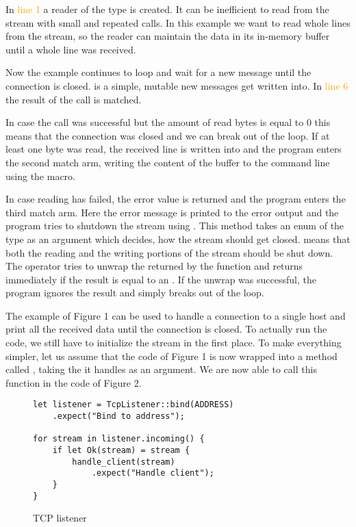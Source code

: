 In \textcolor{orange}{line 1} a reader of the type  is created. It can be inefficient to read
from the stream with small and repeated calls. In this example we want to read whole lines from the stream, so the
reader can maintain the data in its in-memory buffer until a whole line was received.

Now the example continues to loop and wait for a new message until the connection is closed.  is a simple,
mutable  new messages get written into. In \textcolor{orange}{line 6} the result of the call
 is matched.

In case the call was successful but the amount of read bytes is equal to 0 this means that the connection was closed
and we can break out of the loop. If at least one byte was read, the received line is written into  and the
program enters the second match arm, writing the content of the buffer to the command line using the
 macro.

In case reading has failed, the error value is returned and the program enters the third match arm. Here the error
message is printed to the error output and the program tries to shutdown the stream using
. This method takes an enum of the type  as an argument which
decides, how the stream should get closed.  means that both the reading and the writing portions of the
stream should be shut down. The  operator tries to unwrap the  returned by the function and
returns immediately if the result is equal to an . If the unwrap was successful, the program ignores the
result and simply breaks out of the loop.

The example of Figure 1 can be used to handle a connection to a single host and print all the received data until the
connection is closed. To actually run the code, we still have to initialize the stream in the first place. To make
everything simpler, let us assume that the code of Figure 1 is now wrapped into a method called
, taking the  it handles as an argument. We are now able to call this function in
the code of Figure 2.

\begin{figure}[ht]
    \begin{verbatim}
let listener = TcpListener::bind(ADDRESS)
    .expect("Bind to address");

for stream in listener.incoming() {
    if let Ok(stream) = stream {
        handle_client(stream)
            .expect("Handle client");
    }
}
    \end{verbatim}
    \caption{TCP listener}
\end{figure}


